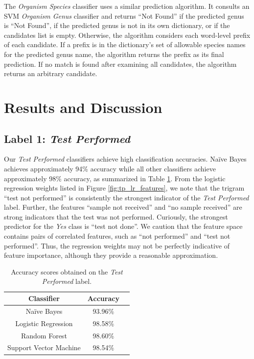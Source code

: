 \documentclass[sigconf]{acmart}
\newcommand{\naive}{Na\"ive }
\begin{document}
The \textit{Organism Species} classifier uses a similar prediction algorithm. It consults an SVM \textit{Organism Genus} classifier and returns ``Not Found'' if the predicted genus is ``Not Found'', if the predicted genus is not in its own dictionary, or if the candidates list is empty. Otherwise, the algorithm considers each word-level prefix of each candidate. If a prefix is in the dictionary's set of allowable species names for the predicted genus name, the algorithm returns the prefix as its final prediction. If no match is found after examining all candidates, the algorithm returns an arbitrary candidate.

\section{Results and Discussion} \label{results_and_discussion}

\subsection{Label 1: \textit{Test Performed}}

Our \textit{Test Performed} classifiers achieve high classification accuracies. \naive Bayes achieves approximately 94\% accuracy while all other classifiers achieve approximately 98\% accuracy, as summarized in Table \ref{tab:tp_accuracies}. From the logistic regression weights listed in Figure \ref{fig:tp_lr_features}, we note that the trigram ``test not performed'' is consistently the strongest indicator of the \textit{Test Performed} label. Further, the features ``sample not received'' and ``no sample received'' are strong indicators that the test was not performed. Curiously, the strongest predictor for the \textit{Yes} class is ``test not done''. We caution that the feature space contains pairs of correlated features, such as ``not performed'' and ``test not performed''. Thus, the regression weights may not be perfectly indicative of feature importance, although they provide a reasonable approximation.

\begin{table}
    \caption{Accuracy scores obtained on the \textit{Test Performed} label.}
    \label{tab:tp_accuracies}
    
    \centering
    \begin{tabular}{ccc}
        \toprule
        Classifier & Accuracy \\
        \midrule
        \naive Bayes & 93.96\% \\
        Logistic Regression & 98.58\% \\
        Random Forest & 98.60\% \\
        Support Vector Machine & 98.54\% \\
        \bottomrule
    \end{tabular}
\end{table}
\end{document}
